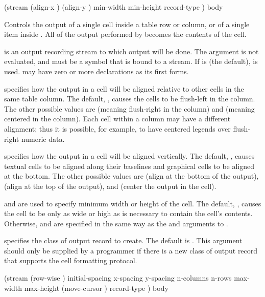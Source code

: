  {(\optional stream
                              \key (align-x ) (align-y )
                                   min-width min-height record-type \allow)
                             \body body}

Controls the output of a single cell inside a table row or column, or of a
single item inside .  All of the output performed by
 becomes the contents of the cell.

 is an output recording stream to which output will be done.  The
 argument is not evaluated, and must be a symbol that is bound to a
stream.  If  is  (the default),  is
used.   may have zero or more declarations as its first forms.

 specifies how the output in a cell will be aligned relative to
other cells in the same table column.  The default, , causes the cells
to be flush-left in the column.  The other possible values are 
(meaning flush-right in the column) and  (meaning centered in the
column).  Each cell within a column may have a different alignment; thus it is
possible, for example, to have centered legends over flush-right numeric data.

 specifies how the output in a cell will be aligned vertically.
The default, , causes textual cells to be aligned along their
baselines and graphical cells to be aligned at the bottom.  The other possible
values are  (align at the bottom of the output),  (align at
the top of the output), and  (center the output in the cell).

 and  are used to specify minimum width or height
of the cell.  The default, , causes the cell to be only as wide or high
as is necessary to contain the cell's contents.  Otherwise,  and
 are specified in the same way as the  and
 arguments to .

 specifies the class of output record to create.  The default
is .  This argument should only be supplied by
a programmer if there is a new class of output record that supports the cell
formatting protocol.


 {(\optional stream
                                   \key (row-wise )
                                        initial-spacing x-spacing y-spacing
                                        n-columns n-rows
                                        max-width max-height
                                        (move-cursor ) record-type \allow)
                                  \body body}

